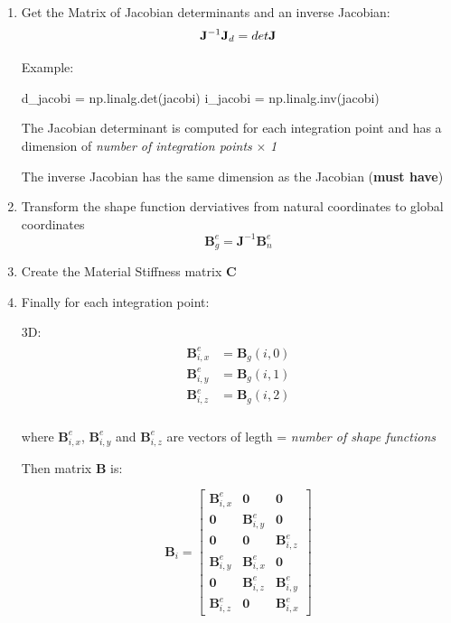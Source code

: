 \documentclass[10pt,b5paper,titlepage]{book}
\newenvironment{eqarray}
{
    \begin{eqnarray}
        \begin{aligned}
}
{
        \end{aligned}
    \end{eqnarray}
}
\begin{document}
\begin{enumerate}
    \item Get the Matrix of Jacobian determinants and an inverse Jacobian:
        \begin{equation}
            \mathbf{J}^{-1}\\
            \mathbf{J}_d = det \mathbf{J}
        \end{equation}

        Example:
        \begin{python}
d_jacobi = np.linalg.det(jacobi)
i_jacobi = np.linalg.inv(jacobi)
        \end{python}

        The Jacobian determinant is computed for each integration point and has a dimension
        of \textit{number of integration points} $\times$ \textit{1}

        The inverse Jacobian has the same dimension as the Jacobian (\textbf{must have})

    \item Transform the shape function derviatives from natural coordinates to
        global coordinates
        \begin{equation}
            \mathbf{B}_g^e = \mathbf{J}^{-1} \mathbf{B}_n^e
        \end{equation}

    \item Create the Material Stiffness matrix $ \mathbf{C} $

    \item Finally for each integration point:

        3D:
        \begin{eqarray}
            \mathbf{B}_{i,x}^e &= \textbf{B}_g(i, 0) \\
            \mathbf{B}_{i,y}^e &= \textbf{B}_g(i, 1) \\
            \mathbf{B}_{i,z}^e &= \textbf{B}_g(i, 2)\\
        \end{eqarray}

        where $ \mathbf{B}_{i,x}^e $,  $ \mathbf{B}_{i,y}^e $ and  $ \mathbf{B}_{i,z}^e $
        are vectors of legth = \textit{number of shape functions}

        Then matrix $ \mathbf{B} $ is:

        \begin{equation}
            \mathbf{B}_i = \begin{bmatrix}
                \textbf{B}_{i,x}^e & \mathbf{0} & \mathbf{0}\\
                \mathbf{0} & \textbf{B}_{i,y}^e & \mathbf{0}\\
                \mathbf{0} & \mathbf{0} & \textbf{B}_{i,z}^e \\
                \textbf{B}_{i,y}^e & \textbf{B}_{i,x}^e & \mathbf{0}\\
                \mathbf{0} & \textbf{B}_{i,z}^e & \textbf{B}_{i,y}^e \\
                \textbf{B}_{i,z}^e & \mathbf{0} & \textbf{B}_{i,x}^e
            \end{bmatrix}
        \end{equation}


\end{enumerate}
\end{document}
